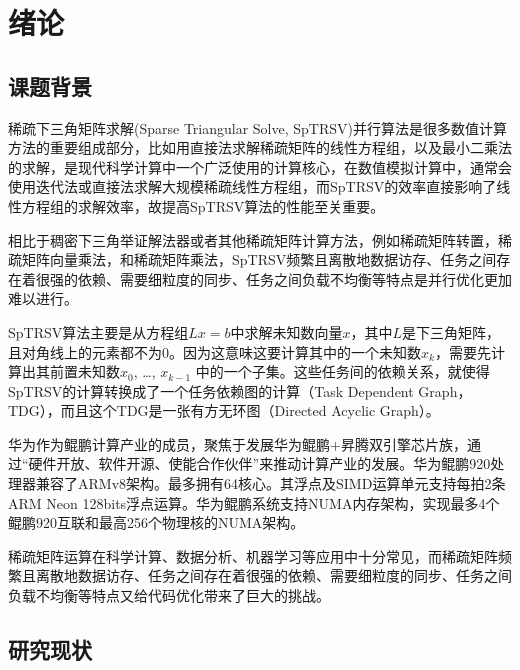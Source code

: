 \chapter{绪论}
\section{课题背景}

稀疏下三角矩阵求解(Sparse Triangular Solve, SpTRSV)并行算法是很多数值计算方法的重要组成部分，比如用直接法求解稀疏矩阵的线性方程组\cite{davis2006direct}，以及最小二乘法的求解\cite{saad2003iterative}，是现代科学计算中一个广泛使用的计算核心，在数值模拟计算中，通常会使用迭代法或直接法求解大规模稀疏线性方程组，而SpTRSV的效率直接影响了线性方程组的求解效率，故提高SpTRSV算法的性能至关重要。

相比于稠密下三角举证解法器\cite{hogg2013fast}或者其他稀疏矩阵计算方法，例如稀疏矩阵转置\cite{wang2016parallel}，稀疏矩阵向量乘法\cite{liu2015csr5}\cite{liu2015speculative}，和稀疏矩阵乘法\cite{liu2015framework}，SpTRSV频繁且离散地数据访存、任务之间存在着很强的依赖、需要细粒度的同步、任务之间负载不均衡等特点是并行优化更加难以进行。

SpTRSV算法主要是从方程组$Lx=b$中求解未知数向量$ x $，其中$ L $是下三角矩阵，且对角线上的元素都不为0。因为这意味这要计算其中的一个未知数$x_k$，需要先计算出其前置未知数$x_0$, \dots, $x_{k-1}$ 中的一个子集。这些任务间的依赖关系，就使得SpTRSV的计算转换成了一个任务依赖图的计算（Task Dependent Graph，TDG），而且这个TDG是一张有方无环图（Directed Acyclic Graph）。

华为作为鲲鹏计算产业的成员，聚焦于发展华为鲲鹏+昇腾双引擎芯片族，通过“硬件开放、软件开源、使能合作伙伴”来推动计算产业的发展。华为鲲鹏920处理器兼容了ARMv8架构。最多拥有64核心。其浮点及SIMD运算单元支持每拍2条ARM Neon 128bits浮点运算。华为鲲鹏系统支持NUMA内存架构，实现最多4个鲲鹏920互联和最高256个物理核的NUMA架构。 

稀疏矩阵运算在科学计算、数据分析、机器学习等应用中十分常见，而稀疏矩阵频繁且离散地数据访存、任务之间存在着很强的依赖、需要细粒度的同步、任务之间负载不均衡等特点又给代码优化带来了巨大的挑战。


\section{研究现状}

\begin{figure}[htbp]
    \centering
    \centering
\end{figure}

